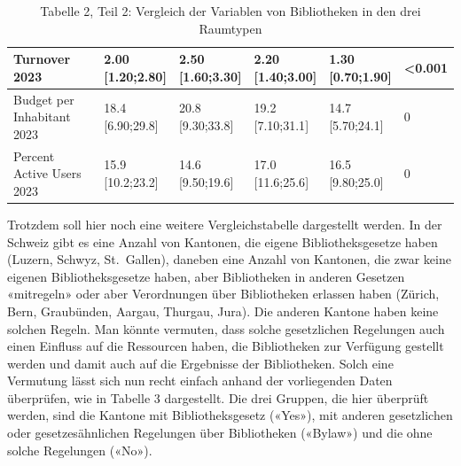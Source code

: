 \documentclass[a4paper,
fontsize=11pt,
oneside,
numbers=noperiodatend,
parskip=half-,
bibliography=totoc,
final
]{scrartcl}
\begin{document}
\begin{landscape}
\begin{table}[]
\begin{tabular}{|l|l|l|l|l|l|}
Turnover 2023                    & \makecell{ 2.00 \\ {[}1.20;2.80{]}}     & \makecell{ 2.50 \\ {[}1.60;3.30{]}}      & \makecell{ 2.20 \\ {[}1.40;3.00{]}}     & \makecell{ 1.30 \\ {[}0.70;1.90{]}}   & \textless{}0.001   \\ \hline
Budget per Inhabitant 2023       & \makecell{ 18.4 \\ {[}6.90;29.8{]}}     & \makecell{ 20.8 \\ {[}9.30;33.8{]}}      & \makecell{ 19.2 \\ {[}7.10;31.1{]}}     & \makecell{ 14.7 \\ {[}5.70;24.1{]}}   & 0                  \\ \hline
Percent Active Users 2023        & \makecell{ 15.9 \\ {[}10.2;23.2{]}}     & \makecell{ 14.6 \\ {[}9.50;19.6{]}}      & \makecell{ 17.0 \\ {[}11.6;25.6{]}}     & \makecell{ 16.5 \\ {[}9.80;25.0{]}}   & 0                  \\ \hline
\end{tabular}
\caption{Tabelle 2, Teil 2: Vergleich der Variablen von Bibliotheken in den drei Raumtypen}
\end{table}
\end{landscape}

Trotzdem soll hier noch eine weitere Vergleichstabelle dargestellt
werden. In der Schweiz gibt es eine Anzahl von Kantonen, die eigene
Bibliotheksgesetze haben (Luzern, Schwyz, St.~Gallen), daneben eine
Anzahl von Kantonen, die zwar keine eigenen Bibliotheksgesetze haben,
aber Bibliotheken in anderen Gesetzen «mitregeln» oder aber Verordnungen
über Bibliotheken erlassen haben (Zürich, Bern, Graubünden, Aargau,
Thurgau, Jura). Die anderen Kantone haben keine solchen Regeln. Man
könnte vermuten, dass solche gesetzlichen Regelungen auch einen Einfluss
auf die Ressourcen haben, die Bibliotheken zur Verfügung gestellt werden
und damit auch auf die Ergebnisse der Bibliotheken. Solch eine Vermutung
lässt sich nun recht einfach anhand der vorliegenden Daten überprüfen,
wie in Tabelle 3 dargestellt. Die drei Gruppen, die hier überprüft
werden, sind die Kantone mit Bibliotheksgesetz («Yes»), mit anderen
gesetzlichen oder gesetzesähnlichen Regelungen über Bibliotheken
(«Bylaw») und die ohne solche Regelungen («No»).
\end{document}
